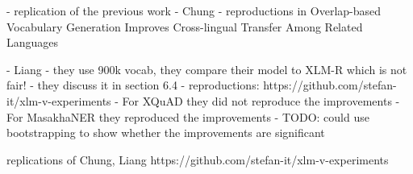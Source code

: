 
- replication of the previous work
    - Chung
        - reproductions in Overlap-based Vocabulary Generation Improves Cross-lingual Transfer Among Related Languages

    - Liang
        - they use 900k vocab, they compare their model to XLM-R which is not fair!
            - they discuss it in section 6.4
        - reproductions: https://github.com/stefan-it/xlm-v-experiments
            - For XQuAD they did not reproduce the improvements
            - For MasakhaNER they reproduced the improvements
            - TODO: could use bootstrapping to show whether the improvements are significant

replications of Chung, Liang
https://github.com/stefan-it/xlm-v-experiments